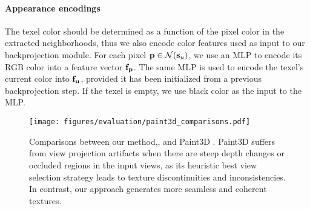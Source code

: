 \paragraph{Appearance encodings}
The texel color should be determined as a function of the pixel color in the extracted neighborhoods, thus we also encode color features used as input to our backprojection module.
For each pixel $\mathbf{p} \in \mathcal{N}(\mathbf{s}_u)$, we use an MLP  to encode its RGB color into a feature vector $\mathbf{f}_{\mathbf{p}}$. The same MLP is used to encode the texel's current color into $\mathbf{f}_{\mathbf{u}}$, provided it has been initialized from a previous backprojection step. If the texel is empty, we use black color as the input to the MLP.

\begin{figure*}[!t]
    \texttt{[image: figures/evaluation/paint3d\_comparisons.pdf]}
    \vspace*{-5mm}
    \caption{Comparisons between our method,\method, and Paint3D \cite{Zeng:2024:Paint3D}. Paint3D suffers from view projection artifacts when there are steep depth changes or occluded regions in the input views, as its heuristic best view selection strategy leads to texture discontinuities and inconsistencies. In contrast, our approach generates more seamless and coherent textures.}
    \label{fig:paint3d_comparison}
    \vspace*{-5mm}
\end{figure*}

